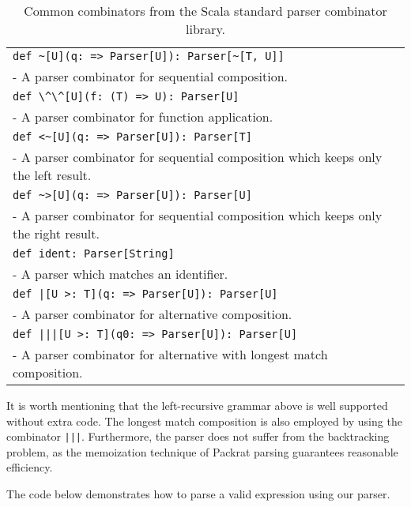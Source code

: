 \begin{table}
\begin{tabularx}{\linewidth}{X}
\hline
\lstinline{def ~[U](q: => Parser[U]): Parser[~[T, U]]} \\
- A parser combinator for sequential composition. \\ \hline
\lstinline{def \^\^[U](f: (T) => U): Parser[U]} \\
- A parser combinator for function application. \\ \hline
\lstinline{def <~[U](q: => Parser[U]): Parser[T]} \\
- A parser combinator for sequential composition which keeps only the left result. \\ \hline
\lstinline{def ~>[U](q: => Parser[U]): Parser[U]} \\
- A parser combinator for sequential composition which keeps only the right result. \\ \hline
\lstinline{def ident: Parser[String]} \\
- A parser which matches an identifier. \\ \hline
\lstinline{def |[U >: T](q: => Parser[U]): Parser[U]} \\
- A parser combinator for alternative composition. \\ \hline
\lstinline{def |||[U >: T](q0: => Parser[U]): Parser[U]} \\
- A parser combinator for alternative with longest match composition. \\ \hline
\end{tabularx}
\caption{Common combinators from the Scala standard parser combinator library.}\label{tab:packrat}
\end{table}

It is worth mentioning that the left-recursive grammar above is well supported without extra code.
 The longest match composition is also employed by using the combinator \lstinline{|||}. Furthermore, the parser does not suffer from the backtracking problem, as the memoization technique of Packrat parsing guarantees reasonable efficiency.

The code below demonstrates how to parse a valid expression  using our parser.

\vspace{-4pt}
\vspace{-10pt}
